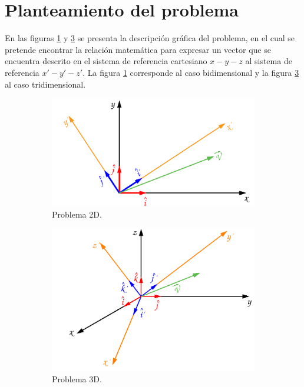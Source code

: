 \documentclass[12pt,letterpaper]{article}
\begin{document}
\section{Planteamiento del problema}
%
En las figuras \ref{planteamiento} y \ref{planteamiento3d} se presenta la descripción gráfica del problema, en el cual se pretende encontrar la relación matemática para expresar un vector que se encuentra descrito en el sistema de referencia cartesiano $x-y-z$ al sistema de referencia $x'-y'-z'$. La figura \ref{planteamiento} corresponde al caso bidimensional y la figura \ref{planteamiento3d} al caso tridimensional.\\
%
\begin{figure}[h]
%	
	\centering
	\begin{subfigure}[l]{0.450\textwidth}
		\includegraphics[width=\textwidth]{img/Planteamiento.pdf}
		\caption{Problema 2D.}
		\label{planteamiento}
	\end{subfigure}
	\hspace{.5 cm}
	\begin{subfigure}[r]{0.450\textwidth}
		\includegraphics[width=\textwidth]{img/Planteamiento3D.pdf}
		\caption{Problema 3D.}
		\label{planteamiento3d}
	\end{subfigure}	
	\caption{}
\end{figure}
%
%
\end{document}
